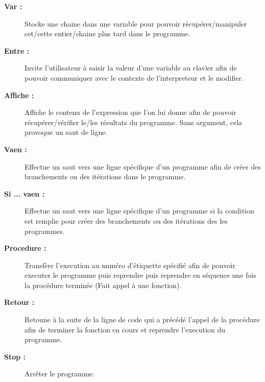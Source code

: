 \begin{description}

	\item [\textbf{Var :}] Stocke une chaine dans une variable pour pouvoir récupérer/manipuler cet/cette entier/chaine plus tard dans le programme.

	\item [\textbf{Entre :}] Invite l'utilisateur à saisir la valeur d'une variable au clavier afin de pouvoir communiquer avec le contexte de l'interpreteur et le modifier.

	\item [\textbf{Affiche :}] Affiche le contenu de l'expression que l'on lui donne afin de pouvoir récupérer/vérifier le/les résultats du programme. Sans argument, cela provoque un saut de ligne.

	\item [\textbf{Vaen :}] Effectue un saut vers une ligne spécifique d'un programme afin de créer des branchements ou des itérations dans le programme.

	\item [\textbf{Si ... vaen :}] Effectue un saut vers une ligne spécifique d'un programme si la condition est remplie pour créer des branchements ou des itérations des les programmes.

	\item [\textbf{Procedure :}] Transfère l'execution au numéro d'étiquette spécifié afin de pouvoir executer le programme puis reprendre puis reprendre en séquence une fois la procédure terminée (Fait appel à une fonction).

	\item [\textbf{Retour :}] Retoune à la suite de la ligne de code qui a précédé l'appel de la procédure afin de terminer la fonction en cours et reprendre l'execution du programme.

	\item [\textbf{Stop :}] Arrêter le programme.
	
\end{description}